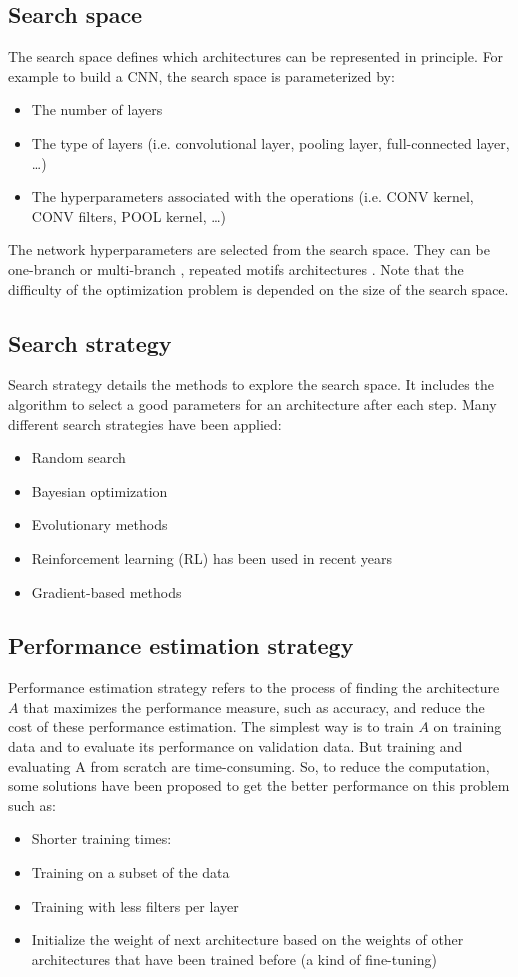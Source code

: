 \documentclass[12pt,a4paper]{article}
\begin{document}
\subsection*{Search space}
The search space defines which architectures can be represented in principle. For example to build a CNN, the search space is parameterized by:
\begin{itemize}
	\item The number of layers
	\item The type of layers (i.e. convolutional layer, pooling layer, full-connected layer, \ldots)
	\item The hyperparameters associated with the operations (i.e. CONV kernel, CONV filters, POOL kernel, \ldots)
\end{itemize}
The network hyperparameters are selected from the search space. They can be one-branch \cite{zoph2016neural, cai2018path} or multi-branch \cite{he2016deep, huang2017densely}, repeated motifs architectures \cite{zoph2017learning, szegedy2016rethinking, huang2017densely}.
Note that the difficulty of the optimization problem is depended on the size of the search space.
\subsection*{Search strategy}
Search strategy details the methods to explore the search space. It includes the algorithm to select a good parameters for an architecture after each step. Many different search strategies have been applied:
\begin{itemize}
	\item Random search
	\item Bayesian optimization
	\item Evolutionary methods
	\item Reinforcement learning (RL) \cite{sutton1998reinforcement} has been used in recent years
	\item Gradient-based methods
\end{itemize}
\subsection*{Performance estimation strategy}
Performance estimation strategy refers to the process of finding the architecture $A$ that maximizes the performance measure, such as accuracy, and reduce the cost of these performance estimation. The simplest way is to train $A$ on training data and to evaluate its performance on validation data. But training and evaluating A from scratch are time-consuming. So, to reduce the computation, some solutions have been proposed to get the better performance on this problem such as:
\begin{itemize}
	\item Shorter training times:
	\item Training on a subset of the data
	\item Training with less filters per layer
	\item Initialize the weight of next architecture based on the weights of other architectures that have been trained before (a kind of fine-tuning)
\end{itemize}
\end{document}
